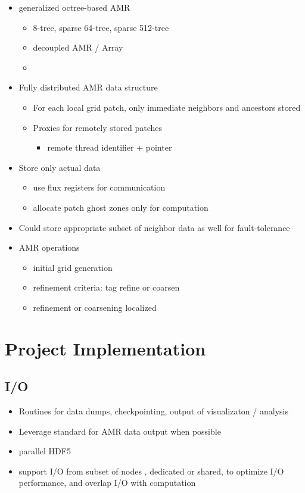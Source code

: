 \documentclass[14pt]{article}
\begin{document}
\begin{itemize}
\item generalized octree-based AMR 
  \begin{itemize}
  \item 8-tree, sparse 64-tree, sparse 512-tree
  \item decoupled AMR / Array
  \item 
  \end{itemize}
\item Fully distributed AMR data structure
  \begin{itemize}
\item For each local grid patch, only immediate neighbors and
  ancestors stored
  \item Proxies for remotely stored patches
    \begin{itemize}
    \item remote thread identifier + pointer
    \end{itemize}
  \end{itemize}
\item Store only actual data
  \begin{itemize}
  \item use flux registers for communication
  \item allocate patch ghost zones only for computation
  \end{itemize}
\item Could store appropriate subset of neighbor data as well for
  fault-tolerance
\item AMR operations
  \begin{itemize}
  \item initial grid generation
  \item refinement criteria: tag refine or coarsen
  \item refinement or coarsening localized
  \end{itemize}
\end{itemize}


\section{Project Implementation}

\subsection{I/O}

\begin{itemize}
\item Routines for data dumps, checkpointing, output of visualizaton /
  analysis
\item Leverage standard for AMR data output when possible
\item parallel HDF5
\item support I/O from subset of nodes , dedicated or shared, to
  optimize I/O performance, and overlap I/O with computation
\end{itemize}
\end{document}
